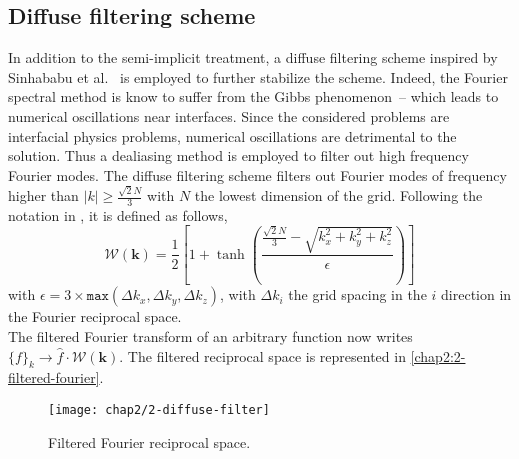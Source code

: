 \subsection{Diffuse filtering scheme}
    In addition to the semi-implicit treatment, a diffuse filtering scheme inspired by Sinhababu et al.\ \cite{SinhababuBhattacharya2022} is employed to further stabilize the scheme. Indeed, the Fourier spectral method is know to suffer from the Gibbs phenomenon\ \cite{vSircaHorvat2012}--\cite{Fornberg1996} which leads to numerical oscillations near interfaces. Since the considered problems are interfacial physics problems, numerical oscillations are detrimental to the solution. Thus a dealiasing method is employed to filter out high frequency Fourier modes.
    The diffuse filtering scheme filters out Fourier modes of frequency higher than $|k| \geq \frac{\sqrt{2}N}{3}$ with $N$ the lowest dimension of the grid. Following the notation in \cite{SinhababuBhattacharya2022}, it is defined as follows,
    \begin{equation}
        \mathcal{W}(\mathbf{k}) = \frac{1}{2}\left[1+\tanh{\left(\frac{\frac{\sqrt{2}N}{3} - \sqrt{k_x^2 + k_y^2 + k_z^2}}{\epsilon}\right)}\right]
    \end{equation}
    with $\epsilon = 3\times\texttt{max}(\Delta k_x, \Delta k_y, \Delta k_z)$, with $\Delta k_i$ the grid spacing in the $i$ direction in the Fourier reciprocal space.\\
    The filtered Fourier transform of an arbitrary function now writes $\{f\}_k\rightarrow \hat{f} \cdot \mathcal{W}(\mathbf{k})$. The filtered reciprocal space is represented in \autoref{chap2:2-filtered-fourier}.
    \begin{figure}
        \centering
        \texttt{[image: chap2/2-diffuse-filter]}
        \caption{Filtered Fourier reciprocal space.}
        \label{chap2:2-filtered-fourier}
    \end{figure}
